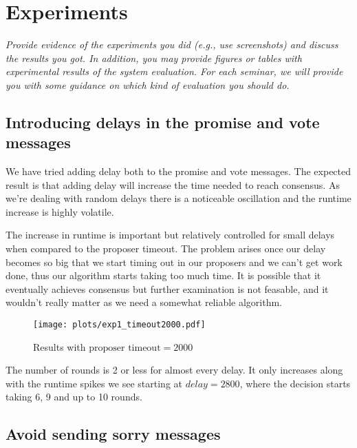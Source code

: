 \documentclass[a4paper, 10pt]{article}
\begin{document}
\section{Experiments}
\textit{Provide evidence of the experiments you did (e.g., use screenshots) and discuss the results you got. In addition, you may provide figures or tables with experimental results of the system evaluation. For each seminar, we will provide you with some guidance on which kind of evaluation you should do.}

\subsection{Introducing delays in the promise and vote messages}

We have tried adding delay both to the promise and vote messages. The expected result is 
that adding delay will increase the time needed to reach consensus. As we're dealing with
random delays there is a noticeable oscillation and the runtime increase is highly volatile.


The increase in runtime is important but relatively controlled for small delays when compared
to the proposer timeout. The problem arises once our delay becomes so big that we start 
timing out in our proposers and we can't get work done, thus our algorithm starts taking too
much time. It is possible that it eventually achieves consensus but further examination 
is not feasable, and it wouldn't really matter as we need a somewhat reliable algorithm. 


\begin{figure}[H]
  \centering
  \texttt{[image: plots/exp1\_timeout2000.pdf]}
    \caption{Results with $\text{proposer timeout}=2000$}
\end{figure}

The number of rounds is 2 or less for almost every delay. It only increases along with the runtime spikes we see starting at $delay=2800$, where the decision starts taking 6, 9 and up to 10 rounds.



\subsection{Avoid sending sorry messages}
\end{document}

